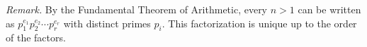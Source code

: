 \textit{Remark.} By the Fundamental Theorem of Arithmetic, every $n > 1$ can be written as $p_{1}^{e_{1}} p_{2}^{e_{2}} \cdots p_{r}^{e_{r}}$ with distinct primes $p_{i}$.
This factorization is unique up to the order of the factors.